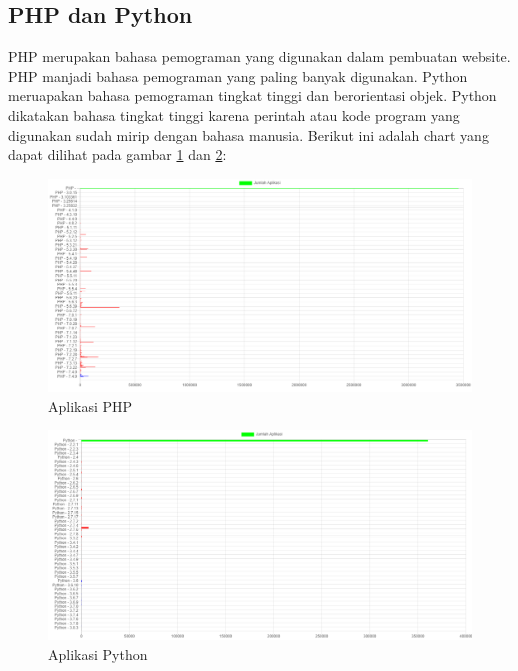 \subsection{PHP dan Python}
PHP merupakan bahasa pemograman yang digunakan dalam pembuatan website. PHP manjadi bahasa pemograman yang paling banyak digunakan. 
Python meruapakan bahasa pemograman tingkat tinggi dan berorientasi objek. Python dikatakan bahasa tingkat tinggi karena perintah atau kode program yang digunakan sudah mirip dengan bahasa manusia. Berikut ini adalah chart yang dapat dilihat pada gambar \ref{fig:data_sample_php} dan \ref{fig:data_sample_python}:
\begin{figure}[H]
	\centering  
	\includegraphics[scale=0.5]{Gambar/hasil_chart_php.png}  
	\caption{Aplikasi PHP} 
	\label{fig:data_sample_php} 
\end{figure}

\begin{figure}[H]
	\centering  
	\includegraphics[scale=0.5]{Gambar/hasil_chart_python.png}  
	\caption{Aplikasi Python} 
	\label{fig:data_sample_python} 
\end{figure}

